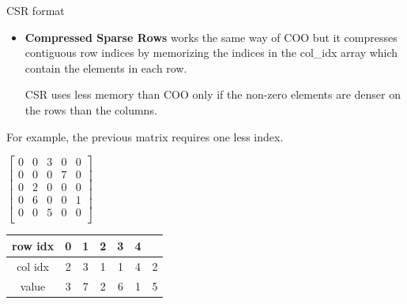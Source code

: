 \documentclass{beamer}
\begin{document}
	\begin{frame}{CSR format}
		\begin{itemize}
			\item \textbf{Compressed Sparse Rows} works the same way of COO but it compresses contiguous row indices by memorizing the indices in the col\_idx array which contain the elements in each row.
			
			\bigskip
			CSR uses less memory than COO only if the non-zero elements are denser on the rows than the columns.
		\end{itemize}
		For example, the previous matrix requires one less index.\\
		
		\bigskip
		\begin{minipage}{.48\textwidth}
			\begin{center}
				$\begin{bmatrix}
					0 & 0 & 3 & 0 & 0 \\
					0 & 0 & 0 & 7 & 0 \\
					0 & 2 & 0 & 0 & 0 \\
					0 & 6 & 0 & 0 & 1 \\
					0 & 0 & 5 & 0 & 0 \\
				\end{bmatrix}$
			\end{center}
		\end{minipage}
		\hfill
		\begin{minipage}{.48\textwidth}
			\begin{center}
				\def\arraystretch{2}
				\begin{tabular}{|c|c|c|c|c|c|c}
					\cline{1-6}
					row idx & 0 & 1 & 2 & 3 & 4 &                        \\ \hline
					col idx & 2 & 3 & 1 & 1 & 4 & \multicolumn{1}{c|}{2} \\ \hline
					value   & 3 & 7 & 2 & 6 & 1 & \multicolumn{1}{c|}{5} \\ \hline
				\end{tabular}
			\end{center}
		\end{minipage}
	\end{frame}
	
\end{document}
